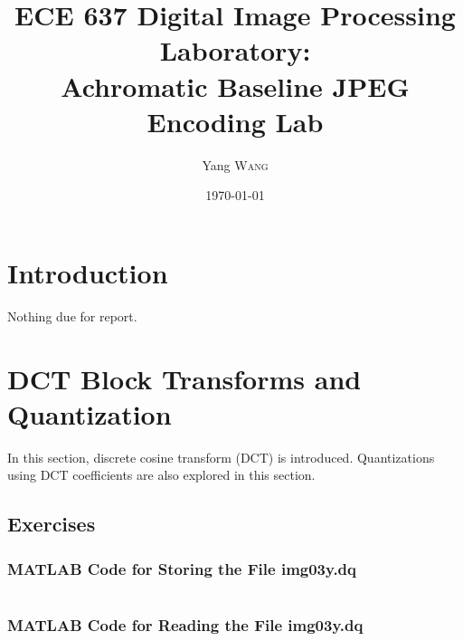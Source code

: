 \documentclass{article}
\title{ECE 637 Digital Image Processing Laboratory: \\ Achromatic Baseline JPEG
Encoding Lab} %
\author{Yang \textsc{Wang}} %
\date{\today} %
\begin{document}
\maketitle %


\section{Introduction}

Nothing due for report.


\section{DCT Block Transforms and Quantization}
	In this section, discrete cosine transform (DCT) is introduced. Quantizations
	using DCT coefficients are also explored in this section.
	\subsection{Exercises}
		\subsubsection{MATLAB Code for Storing the File img03y.dq}
			\inputminted[tabsize=2]{matlab}{../source/writeDq.m}
		\subsubsection{MATLAB Code for Reading the File img03y.dq}
			\inputminted[tabsize=2]{matlab}{../source/readDq.m}
\pagebreak
\end{document}
